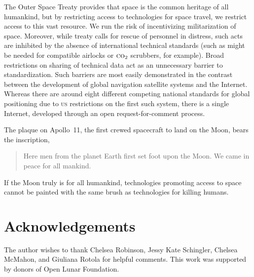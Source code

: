 \documentclass[preprint,twocolumn,5p]{elsarticle}
\begin{document}
The Outer Space Treaty provides that space is the common heritage of all humankind, but by restricting access to technologies for space travel, we restrict access to this vast resource. We run the risk of incentivizing militarization of space. Moreover, while treaty calls for rescue of personnel in distress, such acts are inhibited by the absence of international technical standards (such as might be needed for compatible airlocks or $\textsc{co}_2$ scrubbers, for example). Broad restrictions on sharing of technical data act as an unnecessary barrier to standardization. Such barriers are most easily demonstrated in the contrast between the development of global navigation satellite systems and the Internet. Whereas there are around eight different competing national standards for global positioning due to \textsc{us} restrictions on the first such system, there is a single Internet, developed through an open request-for-comment process.

The plaque on Apollo~11, the first crewed spacecraft to land on the Moon, bears the inscription,
\begin{quote}Here men from the planet Earth first set foot upon the Moon. We came in peace for all mankind.\end{quote} If the Moon truly is for all humankind, technologies promoting access to space cannot be painted with the same brush as technologies for killing humans.

\section{Acknowledgements}
The author wishes to thank Chelsea Robinson, Jessy Kate Schingler, Chelsea McMahon, and Giuliana Rotola for helpful comments. This work was supported by donors of Open Lunar Foundation.

%
%   
\end{document}
